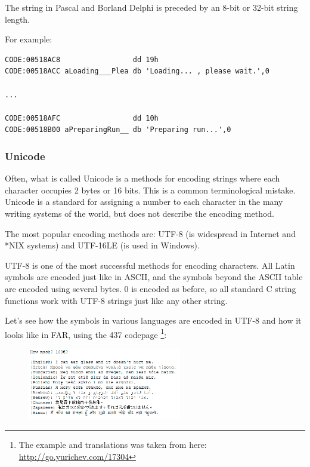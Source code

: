 The string in Pascal and Borland Delphi is preceded by an 8-bit or 32-bit string length.

For example:

\begin{lstlisting}[caption=Delphi]
CODE:00518AC8                 dd 19h
CODE:00518ACC aLoading___Plea db 'Loading... , please wait.',0

...

CODE:00518AFC                 dd 10h
CODE:00518B00 aPreparingRun__ db 'Preparing run...',0
\end{lstlisting}

\subsubsection{Unicode}


Often, what is called Unicode is a methods for encoding strings where each character occupies 2 bytes or 16 bits.
This is a common terminological mistake.
Unicode is a standard for assigning a number to each character in the many writing systems of the 
world, but does not describe the encoding method.

The most popular encoding methods are: UTF-8 (is widespread in Internet and *NIX systems) and UTF-16LE (is used in Windows).


UTF-8 is one of the most successful methods for
encoding characters.
All Latin symbols are encoded just like in ASCII,
and the symbols beyond the ASCII table are encoded using several bytes.
0 is encoded as
before, so all standard C string functions work with UTF-8 strings just like any other string.

Let's see how the symbols in various languages are encoded in UTF-8 and how it looks like in FAR, using the 437 codepage
\footnote{The example and translations was taken from here: 
\url{http://go.yurichev.com/17304}}:

\begin{figure}[H]
\centering
\includegraphics[width=0.6\textwidth]{digging_into_code/strings/multilang_sampler.png}
\end{figure}

